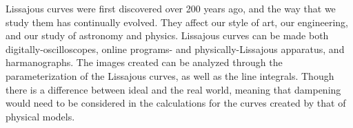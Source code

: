 Lissajous curves were first discovered over 200 years ago, and the way that we study them has continually evolved. They affect our style of art, our engineering, and our study of astronomy and physics. Lissajous curves can be made both digitally-oscilloscopes, online programs- and physically-Lissajous apparatus, and harmanographs. The images created can be analyzed through the parameterization of the Lissajous curves, as well as the line integrals. Though there is a difference between ideal and the real world, meaning that dampening would need to be considered in the calculations for the curves created by that of physical models. 
